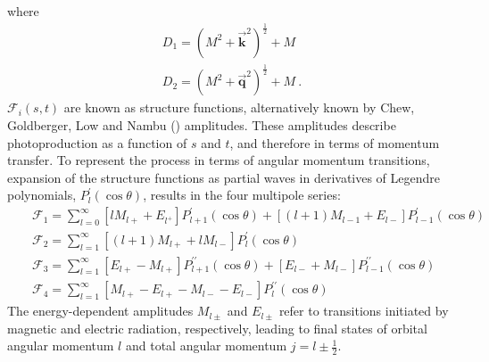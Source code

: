 where
\begin{align}
D_1 = (M^2 + \vec{\mathbf{k}}^2)^{\frac{1}{2}}+M \\
D_2 = (M^2 + \vec{\mathbf{q}}^2)^{\frac{1}{2}}+M \ .
\end{align}
$\mathcal{F}_i(s,t)$ are known as structure functions, alternatively known by Chew, Goldberger, Low and Nambu () amplitudes. These amplitudes describe photoproduction as a function of $s$ and $t$, and therefore in terms of momentum transfer. To represent the process in terms of angular momentum transitions, expansion of the structure functions as partial waves in derivatives of Legendre polynomials, $P_l^\prime(\cos\theta)$, results in the four multipole series:
\begin{align}
&&\mathcal F_1 = \displaystyle\sum_{l=0}^{\infty}[lM_{l+} + E_{l^+}]P_{l+1}^{\prime}(\cos\theta) + [(l+1)M_{l-1} + E_{l-}]P_{l-1}^{\prime}(\cos\theta)\\
&&\mathcal F_2 = \displaystyle\sum_{l=1}^{\infty}[(l+1)M_{l+}+lM_{l-}]P_{l}^{\prime}(\cos\theta)\\
&&\mathcal F_3 = \displaystyle\sum_{l=1}^{\infty}[E_{l+}-M_{l+}]P_{l+1}^{\prime \prime}(\cos\theta) + [E_{l-} + M_{l-}]P_{l-1}^{\prime \prime}(\cos\theta)\\
&&\mathcal F_4 = \displaystyle\sum_{l=1}^{\infty}[M_{l+} - E_{l+} - M_{l-} - E_{l-}]P_{l}^{\prime \prime}(\cos\theta)
\end{align}
The energy-dependent amplitudes $M_{l\pm}$ and $E_{l\pm}$ refer to transitions initiated by magnetic and electric radiation, respectively, leading to final states of orbital angular momentum $l$ and total angular momentum $j=l\pm\frac{1}{2}$. 



